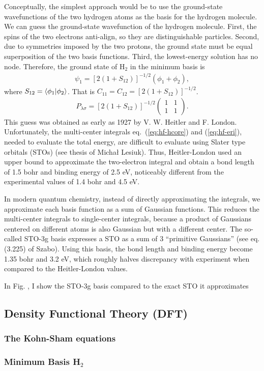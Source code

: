 Conceptually, the simplest approach would be to use the ground-state wavefunctions of the two hydrogen atoms as the basis for the hydrogen molecule. We can guess the ground-state wavefunction of the hydrogen molecule. First, the spins of the two electrons anti-align, so they are distinguishable particles. Second, due to symmetries imposed by the two protons, the ground state must be equal superposition of the two basis functions. Third, the lowest-energy solution has no node. Therefore, the ground state of H$_2$ in the minimum basis is
\begin{align}
\psi_1 = \left[2(1+S_{12})\right]^{-1/2} \left(
\phi_1 + \phi_2
\right),
\end{align}
where $S_{12}=\braket{\phi_1|\phi_2}$. That is $C_{11}=C_{12}=\left[2(1+S_{12})\right]^{-1/2}$.
\begin{align}
P_{\lambda\sigma} = \left[2(1+S_{12})\right]^{-1/2}\left(\begin{array}{cc}
1 & 1 \\
1 & 1
\end{array}\right).
\end{align}
This guess was obtained as early as 1927 by V. W. Heitler and F. London. Unfortunately, the multi-center integrals eq.~(\ref{eq:hf-hcore}) and (\ref{eq:hf-eri}), needed to evaluate the total energy, are difficult to evaluate using Slater type orbitals (STOs) (see thesis of Michał Lesiuk). Thus, Heitler-London used an upper bound to approximate the two-electron integral and obtain a bond length of 1.5 bohr and binding energy of 2.5 eV, noticeably different from the experimental values of 1.4 bohr and 4.5 eV.

In modern quantum chemistry, instead of directly approximating the integrals, we approximate each basis function as a sum of Gaussian functions. This reduces the multi-center integrals to single-center integrals, because a product of Gaussians centered on different atoms is also Gaussian but with a different center. The so-called STO-3g basis expresses a STO as a sum of 3 ``primitive Gaussians'' (see eq. (3.225) of Szabo). Using this basis, the bond length and binding energy become 1.35 bohr and 3.2 eV, which roughly halves discrepancy with experiment when compared to the Heitler-London values.

In Fig. , I show the STO-3g basis compared to the exact STO it approximates

\begin{comment}
\begin{align}
\chi_{nlm}(r, \theta, \phi;\zeta) \equiv \dfrac{(2\zeta)^{n+1/2}}{\sqrt{(2n)!}}
r^{n-1}e^{-\zeta r} Y_{lm}(\theta, \phi).
\end{align}
\begin{align}
g(r; \sigma) = \dfrac{1}{\sigma\sqrt{2\pi}} e^{-\dfrac{r^2}{2\sigma^2}}.
\end{align}
\end{comment}

\subsection{Density Functional Theory (DFT)}
\subsubsection{The Kohn-Sham equations}
\subsubsection{Minimum Basis H$_2$}